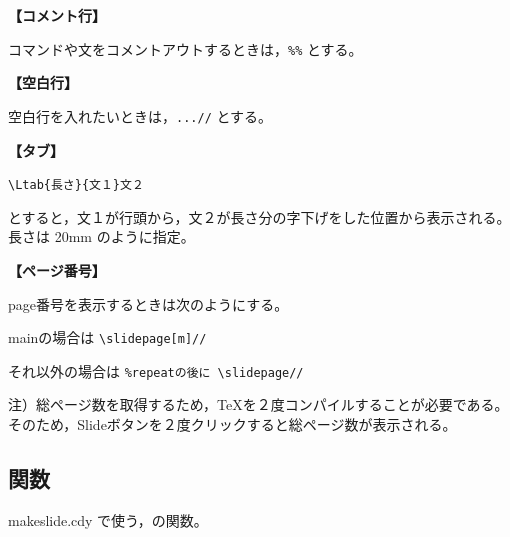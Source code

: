 \documentclass[papersize,a4paper,12pt,uplatex]{jsarticle}
\begin{document}
 
\vspace{\baselineskip}
{\bf 【コメント行】} 

 コマンドや文をコメントアウトするときは，\verb|%%| とする。

\vspace{\baselineskip}
{\bf 【空白行】}

空白行を入れたいときは，\verb|...//| とする。

\vspace{\baselineskip}
{\bf 【タブ】}

\hspace{10mm}\verb|\Ltab{長さ}{文１}文２|

とすると，文１が行頭から，文２が長さ分の字下げをした位置から表示される。長さは 20mm のように指定。

\vspace{\baselineskip}
{\bf 【ページ番号】}

page番号を表示するときは次のようにする。
 
 mainの場合は \verb|\slidepage[m]//|
 
それ以外の場合は \verb|%repeatの後に \slidepage//|
 
 注）総ページ数を取得するため，TeXを２度コンパイルすることが必要である。そのため，Slideボタンを２度クリックすると総ページ数が表示される。

\subsection{関数}
makeslide.cdy で使う，\ketcindy の関数。
\end{document}
